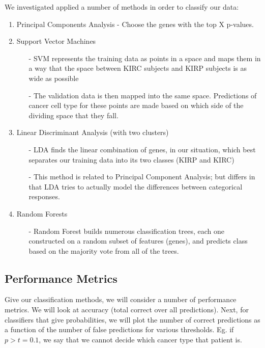 We investigated applied a number of methods in order to classify our data:

\begin{enumerate}
\item Principal Components Analysis - Choose the genes with the top X p-values. 
\item Support Vector Machines
\begin{itemize}
\item[-] SVM represents the training data as points in a space and maps them in a way
that the space between KIRC subjects and KIRP subjects is as wide as possible
\item[-] The validation data is then mapped into the same space. Predictions of cancer
cell type for these points are made based on which side of the dividing space that they fall. 
\end{itemize}
\item Linear Discriminant Analysis (with two clusters)
\begin{itemize}
\item[-] LDA finds the linear combination of genes, in our situation, which best separates our
training data into its two classes (KIRP and KIRC)
\item[-] This method is related to Principal Component Analysis; but differs in that LDA tries to
actually model the differences between categorical responses.
\end{itemize}
\item Random Forests
\begin{itemize}
\item[-] Random Forest builds numerous classification trees, each one constructed on a random subset of
features (genes), and predicts class based on the majority vote from all of the trees.
\end{itemize}
\end{enumerate}

\subsection{Performance Metrics}

Give our classification methods, we will consider a number of performance
metrics. We will look at accuracy (total correct over all predictions). Next,
for classifiers that give probabilities, we will plot the number of correct
predictions as a function of the number of false predictions for various
thresholds. Eg. if $p>t=0.1$, we say that we cannot decide which cancer type
that patient is. 

